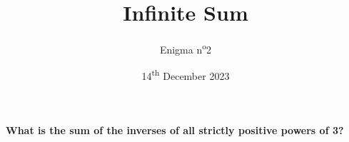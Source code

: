 \documentclass[a4paper, top=10mm]{article}
\title{\textbf{\huge{Infinite Sum}}}
\author{Enigma n\textsuperscript{o}2}
\date{14\textsuperscript{th} December 2023}
\begin{document}
	\maketitle
	
	\vspace{3cm}
	
	\Huge{\textbf{What is the sum of the inverses of all strictly positive powers of 3?}}
	
	
\end{document}
